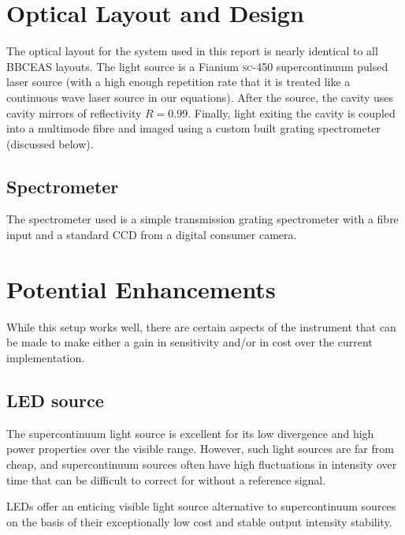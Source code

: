 \section{Optical Layout and Design}

The optical layout for the system used in this report is nearly identical to
all \ac{BBCEAS} layouts. The light source is a Fianium \textsc{sc-450} supercontinuum
pulsed laser source (with a high enough repetition rate that it is treated
like a continuous wave laser source in our equations). After the source, the
cavity uses cavity mirrors of reflectivity $R=0.99$. Finally, light exiting
the cavity is coupled into a multimode fibre and imaged using a custom
built grating spectrometer (discussed below).

\subsection{Spectrometer}

The spectrometer used is a simple transmission grating spectrometer
with a fibre input and a standard \ac{CCD} from a digital
consumer camera.


\section{Potential Enhancements}

While this setup works well, there are certain aspects of the instrument that
can be made to make either a gain in sensitivity and/or in cost over the
current implementation.

\subsection{LED source}

The supercontinuum light source is excellent for its low divergence and high
power properties over the visible range. However, such light sources are far
from cheap, and supercontinuum sources often have high fluctuations in
intensity over time that can be difficult to correct for without a reference
signal.

\acp{LED} offer an enticing visible light source alternative to supercontinuum
sources on the basis of their exceptionally low cost and stable output
intensity stability.

